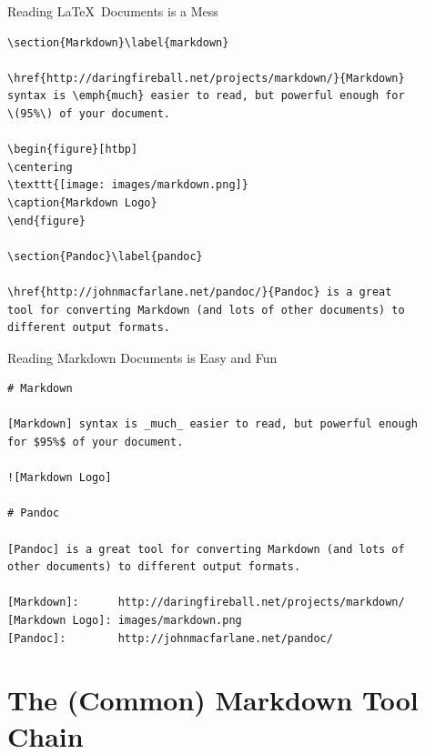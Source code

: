 \documentclass[smaller,ignorenonframetext,]{beamer}
\begin{document}
\begin{frame}[fragile]{Reading \LaTeX~Documents is a Mess}

\begin{lstlisting}
\section{Markdown}\label{markdown}

\href{http://daringfireball.net/projects/markdown/}{Markdown}
syntax is \emph{much} easier to read, but powerful enough for
\(95%\) of your document.

\begin{figure}[htbp]
\centering
\texttt{[image: images/markdown.png]}
\caption{Markdown Logo}
\end{figure}

\section{Pandoc}\label{pandoc}

\href{http://johnmacfarlane.net/pandoc/}{Pandoc} is a great
tool for converting Markdown (and lots of other documents) to
different output formats.
\end{lstlisting}

\end{frame}

\begin{frame}[fragile]{Reading Markdown Documents is Easy and Fun}

\begin{lstlisting}
# Markdown

[Markdown] syntax is _much_ easier to read, but powerful enough
for $95%$ of your document.

![Markdown Logo]

# Pandoc

[Pandoc] is a great tool for converting Markdown (and lots of
other documents) to different output formats.

[Markdown]:      http://daringfireball.net/projects/markdown/
[Markdown Logo]: images/markdown.png
[Pandoc]:        http://johnmacfarlane.net/pandoc/
\end{lstlisting}

\end{frame}

\section{The (Common) Markdown Tool
Chain}\label{the-common-markdown-tool-chain}
\end{document}
